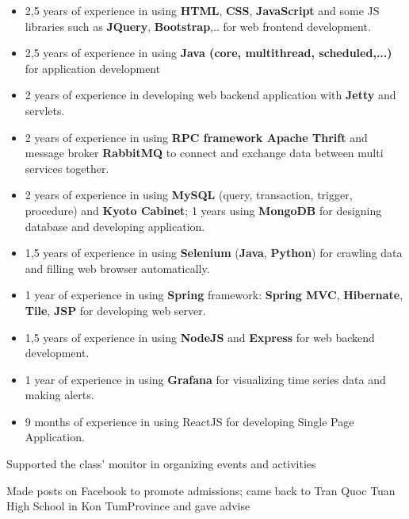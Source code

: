 \documentclass[10pt,a4paper,ragged2e]{altacv}
\begin{document}
\begin{paracol}{2}

\begin{itemize}
\item 2,5 years of experience in using \textbf{HTML}, \textbf{CSS}, \textbf{JavaScript} and some JS libraries such as \textbf{JQuery}, \textbf{Bootstrap},.. for web frontend development.
\item  2,5 years of experience in using \textbf{Java (core, multithread, scheduled,...)} for application development
\item 2 years of experience in developing web backend application with \textbf{Jetty} and servlets.
\item 2 years of experience in using \textbf{RPC framework Apache Thrift} and message broker \textbf{RabbitMQ} to connect and exchange data between multi services together.
\item 2 years of experience in using \textbf{MySQL} (query, transaction, trigger, procedure) and \textbf{Kyoto Cabinet}; 1 years using \textbf{MongoDB} for designing database and developing application.
\item 1,5 years of experience in using \textbf{Selenium} (\textbf{Java}, \textbf{Python}) for crawling data and filling web browser automatically.
\item  1 year of experience in using \textbf{Spring} framework: \textbf{Spring MVC}, \textbf{Hibernate}, \textbf{Tile}, \textbf{JSP} for developing web server.
\item 1,5 years of experience in using \textbf{NodeJS} and \textbf{Express} for web backend development.
\item 1 year of experience in using \textbf{Grafana} for visualizing time series data and making alerts.
\item 9 months of experience in using ReactJS for developing Single Page Application.
\end{itemize}
\newpage


Supported the class’ monitor in organizing events and activities

\divider

Made posts on Facebook to promote admissions; came back to Tran Quoc Tuan High School in Kon TumProvince and gave advise


\end{paracol}
\end{document}
